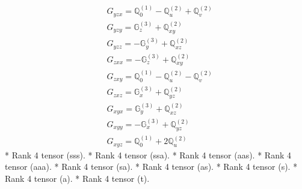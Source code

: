 \documentclass[fleqn,8pt,landscape]{jsarticle}
\begin{document}
\begin{align*}
& G_{yzx} = \mathbb{Q}_{0}^{(1)} - \mathbb{Q}_{u}^{(2)} + \mathbb{Q}_{v}^{(2)} \\
& G_{yzy} = \mathbb{G}_{z}^{(3)} + \mathbb{Q}_{xy}^{(2)} \\
& G_{yzz} = - \mathbb{G}_{y}^{(3)} + \mathbb{Q}_{xz}^{(2)} \\
& G_{zxx} = - \mathbb{G}_{z}^{(3)} + \mathbb{Q}_{xy}^{(2)} \\
& G_{zxy} = \mathbb{Q}_{0}^{(1)} - \mathbb{Q}_{u}^{(2)} - \mathbb{Q}_{v}^{(2)} \\
& G_{zxz} = \mathbb{G}_{x}^{(3)} + \mathbb{Q}_{yz}^{(2)} \\
& G_{xyx} = \mathbb{G}_{y}^{(3)} + \mathbb{Q}_{xz}^{(2)} \\
& G_{xyy} = - \mathbb{G}_{x}^{(3)} + \mathbb{Q}_{yz}^{(2)} \\
& G_{xyz} = \mathbb{Q}_{0}^{(1)} + 2 \mathbb{Q}_{u}^{(2)}
\end{align*}
* Rank 4 tensor (sss).
* Rank 4 tensor (ssa).
* Rank 4 tensor (aas).
* Rank 4 tensor (aaa).
* Rank 4 tensor (sa).
* Rank 4 tensor (as).
* Rank 4 tensor (s).
* Rank 4 tensor (a).
* Rank 4 tensor (t).
\end{document}
